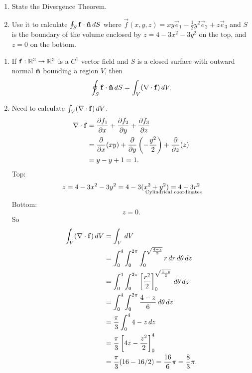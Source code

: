 \documentclass[10pt, a4paper]{article}
\begin{document}
\begin{problem}[$2016$ Question $5$]\phantom{}
    \begin{enumerate}[label = (\alph*)]
        \item State the Divergence Theorem.

        \item Use it to calculate $\oint_{S}\vec{f}\cdot\hvec{n}\,dS$ where $\vec{f}(x, y, z) = xy\vec{e}_1 - \frac{1}{2}y ^ 2\vec{e}_2 + z\vec{e}_3$ and $S$ is the boundary of the volume enclosed by $z = 4 - 3x ^ 2 - 3y ^ 2$ on the top,
        and $z = 0$ on the bottom.
    \end{enumerate}

    \begin{solution}\phantom{}
        \begin{enumerate}[label = (\alph*)]
            \item If $\vec{f} : \R ^ 3 \to \R ^ 3$ is a $C ^ {1}$ vector field and $S$ is a closed surface with outward normal $\hvec{n}$ bounding a region $V$,
            then
            \[
            \oint_{S}\vec{f}\cdot\hvec{n}\,dS = \int_{V}(\bnabla \cdot \vec{f})\,dV.
            \]

            \item Need to calculate $\int_{V}(\bnabla \cdot \vec{f})\,dV$.
            \begin{align*}
                \bnabla \cdot \vec{f} &= \pd[f_1]{x} + \pd[f_2]{y} + \pd[f_3]{z} \\
                &= \pd{x}(xy) + \pd{y}\left(-\frac{y ^ 2}{2}\right) + \pd{z}(z)  \\
                &= y - y + 1 = 1.
            \end{align*}
            Top:
            \[
            z = 4 - 3x ^ 2 - 3y ^ 2 = 4 - 3(x ^ 2 + y ^ 2) \underset{\mathclap{\text{Cylindrical coordinates}}}{=} 4 -3r ^ 2
            \]
            Bottom:
            \[
            z = 0.
            \]
            So
            \begin{align*}
                \int_{V}(\bnabla \cdot \vec{f})\,dV &= \int_{V}\,dV \\
                &= \int_{0}^{4}\int_{0}^{2\pi}\int_{0}^{\sqrt{\frac{4 - z}{3}}}r\,dr\,d\theta\,dz \\
                &= \int_{0}^{4}\int_{0}^{2\pi}\left[\frac{r ^ 2}{2}\right]_{0}^{\sqrt{\frac{4 - z}{3}}}\,d\theta\,dz \\
                &= \int_{0}^{4}\int_{0}^{2\pi}\frac{4 - z}{6}\,d\theta\,dz \\
                &= \frac{\pi}{3}\int_{0}^{4}4 - z\,dz \\
                &= \frac{\pi}{3}\left[4z - \frac{z ^ 2}{2}\right]_{0}^{4} \\
                &= \frac{\pi}{3}(16 - 16 / 2) = \frac{16}{6}\pi = \frac{8}{3}\pi.
            \end{align*}
        \end{enumerate}
    \end{solution}
\end{problem}
\end{document}
